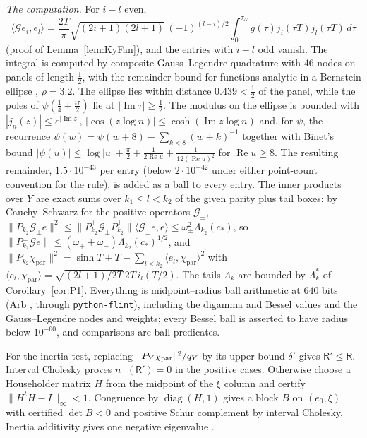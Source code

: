 \documentclass[10pt]{amsart}
\theoremstyle{definition}
\theoremstyle{remark}
\newcommand{\Rel}{\operatorname{Re}}
\newcommand{\Iml}{\operatorname{Im}}
\begin{document}
\emph{The computation.} For $i-l$ even,
\[
\langle\mathcal Ge_i,e_l\rangle=\frac{2T}\pi\sqrt{(2i+1)(2l+1)}\,(-1)^{(l-i)/2}\int_0^{\tau_N}g(\tau)j_i(\tau T)j_l(\tau T)\,d\tau
\]
(proof of Lemma~\ref{lem:KyFan}), and the entries with $i-l$ odd vanish. The integral is computed by composite
Gauss--Legendre quadrature with $46$ nodes on panels of length $\frac12$, with the remainder bound for
functions analytic in a Bernstein ellipse \cite[Thm.~19.3]{Trefethen2013}, $\rho=3.2$. The ellipse lies
within distance $0.439<\frac12$ of the panel, while the poles of $\psi(\frac14\pm\frac{i\tau}2)$ lie at
$|\Iml\tau|\ge\frac12$. The modulus on the ellipse is bounded with $|j_n(z)|\le e^{|\Iml z|}$,
$|\cos(z\log n)|\le\cosh(\Iml z\log n)$ and, for $\psi$, the recurrence $\psi(w)=\psi(w+8)-\sum_{k<8}(w+k)^{-1}$
together with Binet's bound $|\psi(u)|\le\log|u|+\frac\pi2+\frac1{2\Rel u}+\frac1{12(\Rel u)^2}$ for
$\Rel u\ge8$. The resulting remainder, $1.5\cdot10^{-43}$ per entry (below $2\cdot10^{-42}$ under either
point-count convention for the rule), is added as a ball to every entry. The inner products over $Y$ are
exact sums over $k_1\le l<k_2$ of the given parity plus tail boxes: by Cauchy--Schwarz for the positive
operators $\mathcal G_\pm$, $\|P^\perp_{k_2}\mathcal G_\pm e\|^2\le\|P^\perp_{k_2}\mathcal G_\pm P^\perp_{k_2}\|
\langle\mathcal G_\pm e,e\rangle\le\omega_\pm^2\Lambda_{k_2}(c_*)$, so
$\|P^\perp_{k_2}\mathcal Ge\|\le(\omega_++\omega_-)\Lambda_{k_2}(c_*)^{1/2}$, and
$\|P^\perp_{k_2}\chi_{\mathrm{par}}\|^2=\sinh T\pm T-\sum_{l<k_2}\langle e_l,\chi_{\mathrm{par}}\rangle^2$ with
$\langle e_l,\chi_{\mathrm{par}}\rangle=\sqrt{(2l+1)/2T}\,2T\,i_l(T/2)$. The tails $\Lambda_k$ are bounded by
$\Lambda^*_k$ of Corollary~\ref{cor:P1}. Everything is midpoint--radius ball arithmetic at $640$ bits
(Arb \cite{Johansson2017}, through \texttt{python-flint}), including the digamma and Bessel values and the
Gauss--Legendre nodes and weights; every Bessel ball is asserted to have radius below $10^{-60}$, and
comparisons are ball predicates.

For the inertia test, replacing $\|P_Y\chi_{\rm par}\|^2/q_Y$ by its
upper bound $\delta'$ gives $\mathsf R'\le\mathsf R$. Interval Cholesky
proves $n_-(\mathsf R')=0$ in the positive cases. Otherwise choose a
Householder matrix $H$ from the midpoint of the $\xi$ column and certify
$\|H^tH-I\|_\infty<1$. Congruence by $\operatorname{diag}(H,1)$ gives
a block $B$ on $(e_0,\xi)$ with certified $\det B<0$ and positive Schur
complement by interval Cholesky. Inertia additivity gives one negative
eigenvalue \cite{Haynsworth1968}.
\end{document}
